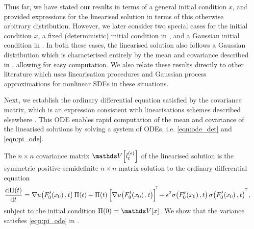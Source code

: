 Thus far, we have stated our results in terms of a general initial condition \(x\), and provided expressions for the linearised solution in terms of this otherwise arbitrary distribution.
However, we later consider two special cases for the initial condition \(x\), a fixed (deterministic) initial condition in , and a Gaussian initial condition in .
In both these cases, the linearised solution also follows a Gaussian distribution which is characterised entirely by the mean and covariance described in , allowing for easy computation.
We also relate these results directly to other literature \citep{Jazwinski_2014_StochasticProcessesFiltering,FreidlinWentzell_1998_RandomPerturbationsDynamical,Blagoveshchenskii_1962_DiffusionProcessesDepending,Balasuriya_2020_StochasticSensitivityComputable,Sanz-AlonsoStuart_2017_GaussianApproximationsSmall,SarkkaSolin_2019_AppliedStochasticDifferential} which uses linearisation procedures and Gaussian process approximations for nonlinear SDEs in these situations.

Next, we establish the ordinary differential equation satisfied by the covariance matrix, which is an expression consistent with linearisations schemes described elsewhere \citep{ArchambeauEtAl_2007_GaussianProcessApproximations,SarkkaSolin_2019_AppliedStochasticDifferential,Jazwinski_2014_StochasticProcessesFiltering,Sanz-AlonsoStuart_2017_GaussianApproximationsSmall}.
This ODE enables rapid computation of the mean and covariance of the linearised solutions by solving a system of ODEs, i.e. \cref{eqn:ode_det} and \cref{eqn:pi_ode}.

\begin{remark}\label{rem:cov_ode}
	The \(n\times n\) covariance matrix \(\var{l_t^{(\epsilon)}}\) of the linearised solution is the symmetric positive-semidefinite \(n \times n\) matrix solution to the ordinary differential equation
	\begin{equation}
		\dod{\Pi(t)}{t} = \begin{multlined}[t]
			\nabla u\!\left(F_0^t\!\left(x_0\right), t\right) \Pi(t) + \Pi(t)\left[\nabla u\!\left(F_0^t\!\left(x_0\right), t\right)\right]^{\!\T}\! + \epsilon^2\sigma\!\left(F_0^t\!\left(x_0\right), t\right)\sigma\!\left(F_0^t\!\left(x_0\right), t\right)^{\T}\!,
		\end{multlined}
		\label{eqn:pi_ode}
	\end{equation}
	subject to the initial condition \(\Pi(0) = \var{x}\).
	We show that the variance satisfies \cref{eqn:pi_ode} in .
\end{remark}





